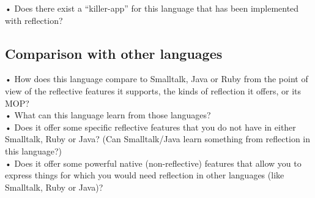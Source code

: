 •	Does there exist a “killer-app” for this language that has been implemented with reflection?\\

\subsection{Comparison with other languages}
•	How does this language compare to Smalltalk, Java or Ruby from the point of view of the reflective features it supports, the kinds of reflection it offers, or its MOP?\\
•	What can this language learn from those languages?\\
•	Does it offer some specific reflective features that you do not have in either Smalltalk, Ruby or Java? (Can Smalltalk/Java learn something from reflection in this language?)\\
•	Does it offer some powerful native (non-reflective) features that allow you to express things for which you would need reflection in other languages (like Smalltalk, Ruby or Java)?\\
